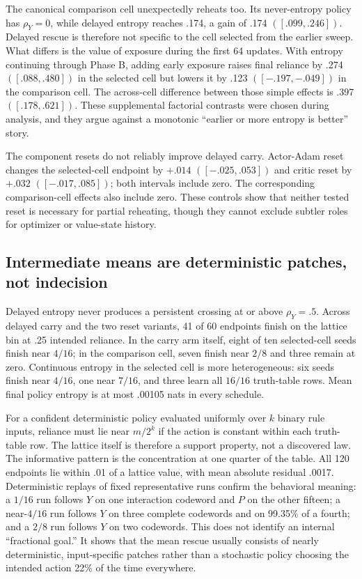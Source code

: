 \documentclass[11pt,a4paper]{article}
\newcommand{\rhoY}{\rho_Y}
\begin{document}
The canonical comparison cell unexpectedly reheats too. Its never-entropy policy has $\rhoY=0$, while delayed entropy reaches .174, a gain of .174 $([.099,.246])$. Delayed rescue is therefore not specific to the cell selected from the earlier sweep. What differs is the value of exposure during the first 64 updates. With entropy continuing through Phase B, adding early exposure raises final reliance by .274 $([.088,.480])$ in the selected cell but lowers it by .123 $([-.197,-.049])$ in the comparison cell. The across-cell difference between those simple effects is .397 $([.178,.621])$. These supplemental factorial contrasts were chosen during analysis, and they argue against a monotonic ``earlier or more entropy is better'' story.

The component resets do not reliably improve delayed carry. Actor-Adam reset changes the selected-cell endpoint by $+.014$ $([-.025,.053])$ and critic reset by $+.032$ $([-.017,.085])$; both intervals include zero. The corresponding comparison-cell effects also include zero. These controls show that neither tested reset is necessary for partial reheating, though they cannot exclude subtler roles for optimizer or value-state history.

\subsection*{Intermediate means are deterministic patches, not indecision}

Delayed entropy never produces a persistent crossing at or above $\rhoY=.5$. Across delayed carry and the two reset variants, 41 of 60 endpoints finish on the lattice bin at .25 intended reliance. In the carry arm itself, eight of ten selected-cell seeds finish near $4/16$; in the comparison cell, seven finish near $2/8$ and three remain at zero. Continuous entropy in the selected cell is more heterogeneous: six seeds finish near $4/16$, one near $7/16$, and three learn all $16/16$ truth-table rows. Mean final policy entropy is at most .00105 nats in every schedule.

For a confident deterministic policy evaluated uniformly over $k$ binary rule inputs, reliance must lie near $m/2^k$ if the action is constant within each truth-table row. The lattice itself is therefore a support property, not a discovered law. The informative pattern is the concentration at one quarter of the table. All 120 endpoints lie within .01 of a lattice value, with mean absolute residual .0017. Deterministic replays of fixed representative runs confirm the behavioral meaning: a $1/16$ run follows $Y$ on one interaction codeword and $P$ on the other fifteen; a near-$4/16$ run follows $Y$ on three complete codewords and on 99.35\% of a fourth; and a $2/8$ run follows $Y$ on two codewords. This does not identify an internal ``fractional goal.'' It shows that the mean rescue usually consists of nearly deterministic, input-specific patches rather than a stochastic policy choosing the intended action 22\% of the time everywhere.
\end{document}
